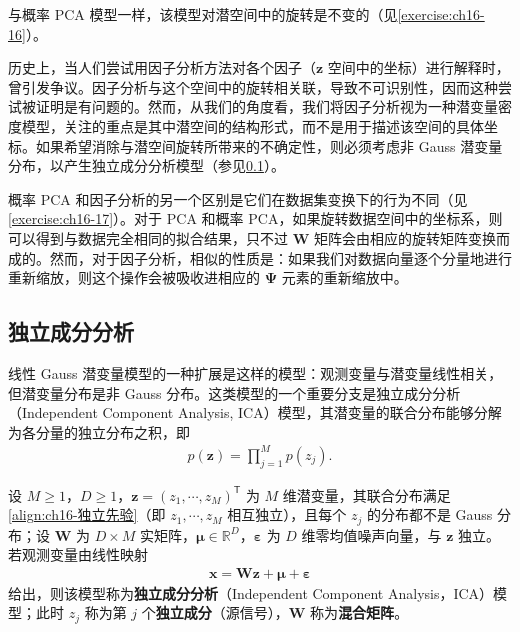 \documentclass[../../main.tex]{subfiles}
\begin{document}
与概率 PCA 模型一样，该模型对潜空间中的旋转是不变的（见\cref{exercise:ch16-16}）。

历史上，当人们尝试用因子分析方法对各个因子（$\bm{z}$ 空间中的坐标）进行解释时，曾引发争议。因子分析与这个空间中的旋转相关联，导致不可识别性，因而这种尝试被证明是有问题的。然而，从我们的角度看，我们将因子分析视为一种潜变量密度模型，关注的重点是其中潜空间的结构形式，而不是用于描述该空间的具体坐标。如果希望消除与潜空间旋转所带来的不确定性，则必须考虑非 Gauss 潜变量分布，以产生独立成分分析模型（参见\cref{subsection:ch16-独立成分分析}）。

概率 PCA 和因子分析的另一个区别是它们在数据集变换下的行为不同（见\cref{exercise:ch16-17}）。对于 PCA 和概率 PCA，如果旋转数据空间中的坐标系，则可以得到与数据完全相同的拟合结果，只不过 $\bm{W}$ 矩阵会由相应的旋转矩阵变换而成的。然而，对于因子分析，相似的性质是：如果我们对数据向量逐个分量地进行重新缩放，则这个操作会被吸收进相应的 $\bm{\Psi}$ 元素的重新缩放中。

\subsection{独立成分分析}\label{subsection:ch16-独立成分分析}

线性 Gauss 潜变量模型的一种扩展是这样的模型：观测变量与潜变量线性相关，但潜变量分布是非 Gauss 分布。这类模型的一个重要分支是独立成分分析（Independent Component Analysis, ICA）模型，其潜变量的联合分布能够分解为各分量的独立分布之积，即
\begin{align}
  p(\bm{z})=\prod_{j=1}^{M}p(z_j).
  \label{align:ch16-独立先验}
\end{align}

\begin{definition}[独立成分分析]\label{definition:ch16-独立成分分析}
设 $M\geqslant1$，$D\geqslant1$，$\bm{z}=(z_1,\cdots,z_M)^{\mathsf T}$ 为 $M$ 维潜变量，其联合分布满足\eqref{align:ch16-独立先验}（即 $z_1,\cdots,z_M$ 相互独立），且每个 $z_j$ 的分布都不是 Gauss 分布；设 $\bm{W}$ 为 $D\times M$ 实矩阵，$\bm{\mu}\in\mathbb{R}^{D}$，$\bm{\varepsilon}$ 为 $D$ 维零均值噪声向量，与 $\bm{z}$ 独立。若观测变量由线性映射
\begin{align*}
  \bm{x}=\bm{W}\bm{z}+\bm{\mu}+\bm{\varepsilon}
\end{align*}
给出，则该模型称为\textbf{独立成分分析}（Independent Component Analysis，ICA）模型；此时 $z_j$ 称为第 $j$ 个\textbf{独立成分}（源信号），$\bm{W}$ 称为\textbf{混合矩阵}。
\end{definition}
\end{document}

